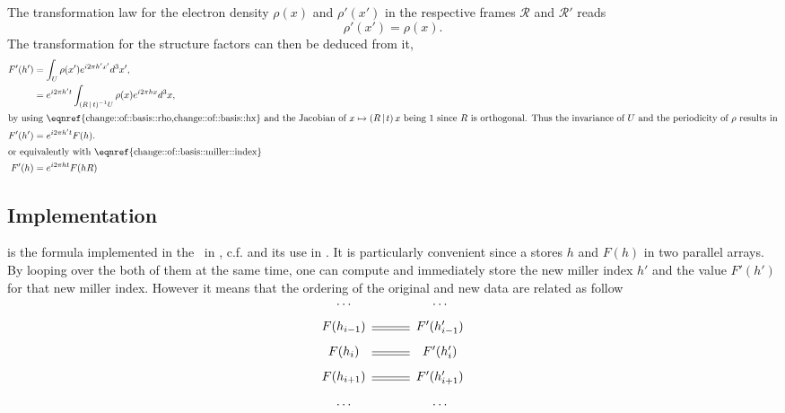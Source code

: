 \documentclass[11pt]{article}
\begin{document}
The transformation law for the electron density $\rho(x)$ and $\rho'(x')$ in the respective frames 
$\mathcal{R}$ and $\mathcal{R}'$ reads
\begin{equation}
\rho'(x') = \rho(x).
\label{eqn:change::of::basis::rho}
\end{equation}
The transformation for the structure factors can then be deduced from it,
\begin{align}
F'(h') &= \int_U \rho(x') e^{i2\pi h'x'}d^3x', \nonumber\\
&= e^{i2\pi h' t}  \int_{\sym{R}{t}^{-1}U} \rho(x) e^{i2\pi h x} d^3x, \nonumber\\
\intertext{by using \eqnref{change::of::basis::rho,change::of::basis::hx} and the Jacobian of $x \mapsto \sym{R}{t}x$ being 1 since $R$ is orthogonal. Thus the invariance of $U$ and the periodicity of $\rho$ results in}
F'(h') &= e^{i2\pi h't} F(h).
\label{eqn:change::of::basis::F}\\
\intertext{or equivalently with \eqnref{change::of::basis::miller::index}}
F'(h) &= e^{i2\pi ht} F(hR)
\label{eqn:change::of::basis::F::bis}
\end{align}

\subsection{Implementation}

 is the formula implemented in the \cctbx\ in , c.f.  and its use in . It is particularly convenient since a  stores $h$ and $F(h)$ in two parallel arrays. By looping over the both of them at the same time, one can compute and immediately store the new miller index $h'$ and the value $F'(h')$ for that new miller index. However it means that the ordering of the original and new data are related as follow
\begin{equation}
\begin{CD}
\ldots @. \ldots\\
F(h_{i-1}) @= F'(h'_{i-1})\\
F(h_i) @= F'(h'_i)\\
F(h_{i+1}) @= F'(h'_{i+1})\\
\ldots @. \ldots
\end{CD}
\label{eqn:miller::array::change::basis}
\end{equation}
\end{document}
